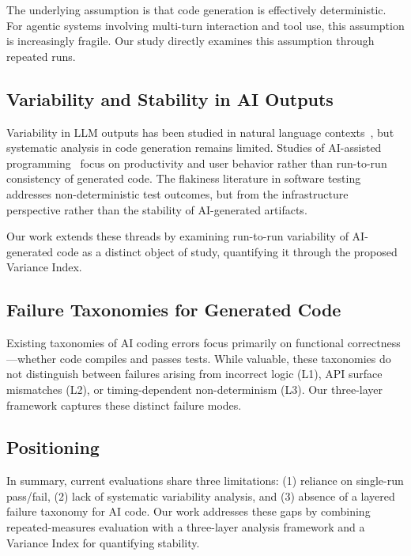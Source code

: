 \documentclass[conference]{IEEEtran}
\begin{document}
The underlying assumption is that code generation is effectively deterministic. For agentic systems involving multi-turn interaction and tool use, this assumption is increasingly fragile. Our study directly examines this assumption through repeated runs.

\subsection{Variability and Stability in AI Outputs}

Variability in LLM outputs has been studied in natural language contexts~\cite{brown2020language}, but systematic analysis in code generation remains limited. Studies of AI-assisted programming~\cite{peng2023impact, ziegler2022productivity, mozannar2023reading} focus on productivity and user behavior rather than run-to-run consistency of generated code. The flakiness literature in software testing~\cite{lu2021codexglue} addresses non-deterministic test outcomes, but from the infrastructure perspective rather than the stability of AI-generated artifacts.

Our work extends these threads by examining run-to-run variability of AI-generated code as a distinct object of study, quantifying it through the proposed Variance Index.

\subsection{Failure Taxonomies for Generated Code}

Existing taxonomies of AI coding errors focus primarily on functional correctness---whether code compiles and passes tests. While valuable, these taxonomies do not distinguish between failures arising from incorrect logic (L1), API surface mismatches (L2), or timing-dependent non-determinism (L3). Our three-layer framework captures these distinct failure modes.

\subsection{Positioning}

In summary, current evaluations share three limitations: (1) reliance on single-run pass/fail, (2) lack of systematic variability analysis, and (3) absence of a layered failure taxonomy for AI code. Our work addresses these gaps by combining repeated-measures evaluation with a three-layer analysis framework and a Variance Index for quantifying stability.
\end{document}
